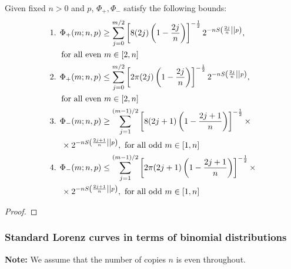 \documentclass[pra,
aps,
twocolumn,
superscriptaddress,
groupedaddress,
nofootinbib,
reprint
]{revtex4-1}
\begin{document}
\begin{lemma}\label{lem:bounds_strict}
	Given fixed $n>0$ and $p$, $\Phi_+, \Phi_-$ satisfy the following bounds:
	\begin{align*}
		\begin{split}
		&\text{1. } \Phi_+(m; n, p) \geq \sum\limits_{j=0}^{m/2}\left[ 8(2j)\left(1-\frac{2j}{n}\right) \right]^{-\frac{1}{2}} 2^{-n\ent{\frac{2j}{n}}{p}}, \\
		&\hspace{14pt} \text{for all even } m\in [2,n] \\
		&\text{2. } \Phi_+(m; n, p) \leq \sum\limits_{j=0}^{m/2}\left[ 2\pi(2j)\left(1-\frac{2j}{n}\right) \right]^{-\frac{1}{2}} 2^{-n\ent{\frac{2j}{n}}{p}}, \\
		&\hspace{14pt} \text{for all even } m\in [2,n] \\
		&\text{3. } \Phi_-(m; n, p) \geq \sum\limits_{j=1}^{(m-1)/2}\left[ 8(2j+1)\left(1-\frac{2j+1}{n}\right) \right]^{-\frac{1}{2}} \times \\
		&\hspace{14pt} \times 2^{-n\ent{\frac{2j+1}{n}}{p}},\ \text{for all odd } m\in [1,n] \\
		&\text{4. } \Phi_-(m; n, p) \leq \sum\limits_{j=1}^{(m-1)/2}\left[ 2\pi(2j+1)\left(1-\frac{2j+1}{n}\right) \right]^{-\frac{1}{2}} \times \\
		&\hspace{14pt} \times 2^{-n\ent{\frac{2j+1}{n}}{p}},\ \text{for all odd } m\in [1,n]
		\end{split}
	\end{align*}
\end{lemma}
\begin{proof}
\end{proof}

\subsubsection{Standard Lorenz curves in terms of binomial distributions}
\textbf{Note:} We assume that the number of copies $n$ is even throughout.
\end{document}

